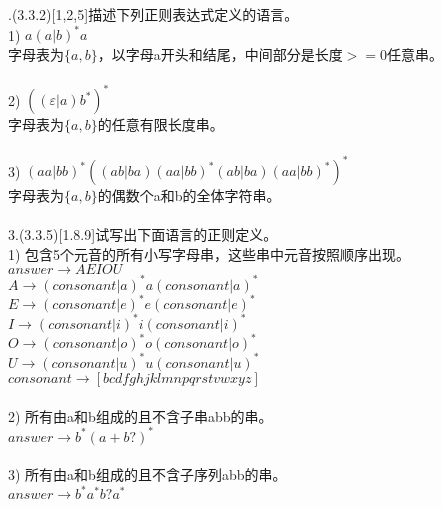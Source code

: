 \documentclass[a4paper, 16pt]{article}
\begin{document}
.(3.3.2)[1,2,5]描述下列正则表达式定义的语言。\\
1) $a(a|b)^*a$\\
字母表为$\{a,b\}$，以字母a开头和结尾，中间部分是长度$>=0$任意串。\\
\\
2) $((\varepsilon|a)b^*)^*$\\
字母表为$\{a,b\}$的任意有限长度串。\\
\\
3) $(aa|bb)^*((ab|ba)(aa|bb)^*(ab|ba)(aa|bb)^*)^*$\\
字母表为$\{a,b\}$的偶数个a和b的全体字符串。\\
\bigskip
\\
3.(3.3.5)[1.8.9]试写出下面语言的正则定义。\\
1) 包含5个元音的所有小写字母串，这些串中元音按照顺序出现。\\
$answer \rightarrow  AEIOU$\\
$A \rightarrow (consonant|a)^*a(consonant|a)^* $\\
$E \rightarrow (consonant|e)^*e(consonant|e)^* $\\
$I\rightarrow (consonant|i)^*i(consonant|i)^* $\\
$O \rightarrow (consonant|o)^*o(consonant|o)^* $\\
$U \rightarrow (consonant|u)^*u(consonant|u)^* $\\
$consonant \rightarrow  [bcdfghjklmnpqrstvwxyz] $\\
\\
2) 所有由a和b组成的且不含子串abb的串。\\
$answer \rightarrow b^*(a+b?)^* $\\
\\
3) 所有由a和b组成的且不含子序列abb的串。\\
$answer \rightarrow b^*a^*b?a^*$\\
\end{document}
